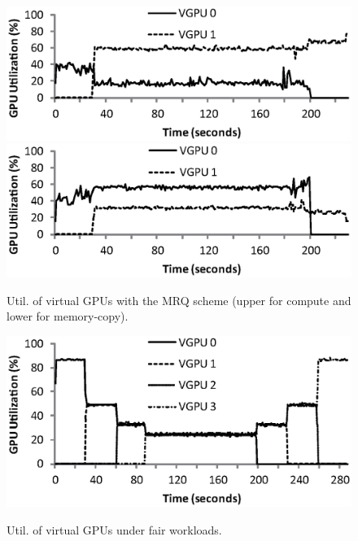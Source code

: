 \begin{figure}[t]
 \begin{center}
  \includegraphics[width=0.93\hsize]{eps/vgpu_2_band_compute.eps}\\
  \vspace{-0.5em}
  \includegraphics[width=0.93\hsize]{eps/vgpu_2_band_memory.eps}\\
  \vspace{-1.5em}
  \caption{Util. of virtual GPUs with the MRQ scheme (upper for compute
  and lower for memory-copy).}
  \label{fig:vgpu_2_band_mrq}
 \end{center}
 \begin{center}
  \includegraphics[width=0.93\hsize]{eps/vgpu_fair_4_band.eps}\\
  \vspace{-1.5em}
  \caption{Util. of virtual GPUs under fair workloads.}
  \label{fig:vgpu_fair_4_band}
 \end{center}
  \vspace{-1.5em}
\end{figure}
